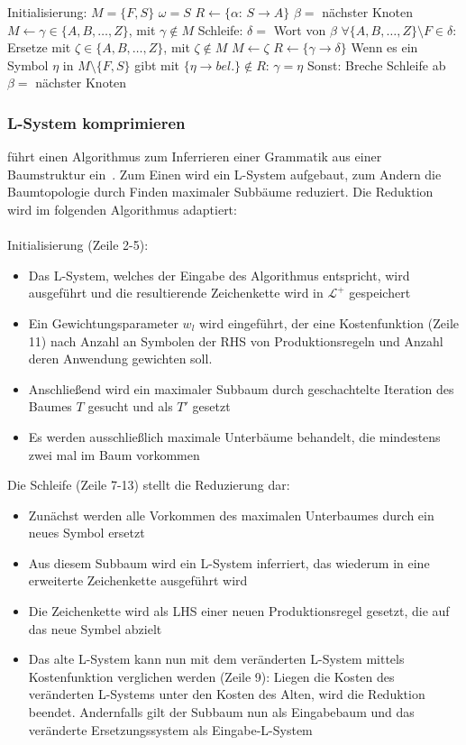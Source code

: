 \begin{algorithm}[caption={Inferieren eines L-Systems aus einer Baumstruktur}, label={alg2}]
    Initialisierung:
    $M=\{F,S\}$
    $\omega=S$
    $R \gets \{\alpha$: $S \rightarrow A\}$
    $\beta=$ nächster Knoten
    $M \gets \gamma \in \{A,B,\dots,Z\}$, mit $\gamma \notin M$
    Schleife:
    $\delta=$ Wort von $\beta$
    $\forall \{A,B,\dots,Z\} \setminus F \in \delta:$
    Ersetze mit $\zeta \in \{A,B,\dots,Z\}$, mit $\zeta \notin M$
    $M \gets \zeta$
    $R \gets \{\gamma\rightarrow\delta\}$
    Wenn es ein Symbol $\eta$ in $M\setminus\{F,S\}$ gibt mit $\{\eta \rightarrow bel.\} \notin R$:
    $\gamma=\eta$
    Sonst:
    Breche Schleife ab
    $\beta=$ nächster Knoten
\end{algorithm}

\subsubsection*{L-System komprimieren}
\citeauthor{guo_2020} führt einen Algorithmus zum Inferrieren einer Grammatik aus einer Baumstruktur ein~\cite{guo_2020}.
Zum Einen wird ein L-System aufgebaut, zum Andern die Baumtopologie durch Finden maximaler Subbäume reduziert.
Die Reduktion wird im folgenden Algorithmus adaptiert:\\~\\
Initialisierung (Zeile 2-5):
\begin{itemize}
    \item Das L-System, welches der Eingabe des Algorithmus entspricht, wird ausgeführt und
    die resultierende Zeichenkette wird in $\mathcal{L^+}$ gespeichert
    \item Ein Gewichtungsparameter $w_l$ wird eingeführt, der eine Kostenfunktion (Zeile 11) nach Anzahl an Symbolen
    der RHS von Produktionsregeln und Anzahl deren Anwendung gewichten soll.
    \item Anschließend wird ein maximaler Subbaum durch geschachtelte Iteration des Baumes $T$ gesucht und als $T'$ gesetzt
    \item Es werden ausschließlich maximale Unterbäume behandelt, die mindestens zwei mal im Baum vorkommen
\end{itemize}
Die Schleife (Zeile 7-13) stellt die Reduzierung dar:
\begin{itemize}
    \item Zunächst werden alle Vorkommen des maximalen Unterbaumes durch ein neues Symbol ersetzt
    \item Aus diesem Subbaum wird ein L-System inferriert, das wiederum in eine erweiterte Zeichenkette ausgeführt wird
    \item Die Zeichenkette wird als LHS einer neuen Produktionsregel gesetzt, die auf das neue Symbel abzielt
    \item Das alte L-System kann nun mit dem veränderten L-System mittels Kostenfunktion verglichen werden (Zeile 9):
    Liegen die Kosten des veränderten L-Systems unter den Kosten des Alten, wird die Reduktion beendet.
    Andernfalls gilt der Subbaum nun als Eingabebaum und das veränderte Ersetzungssystem als Eingabe-L-System
\end{itemize}

